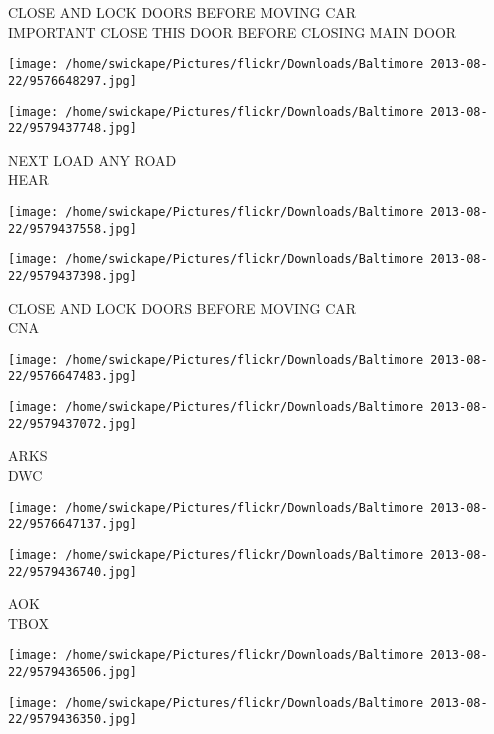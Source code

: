 \documentclass[10pt,letterpaper]{article}
\begin{document}
CLOSE AND LOCK DOORS BEFORE MOVING CAR\\
IMPORTANT CLOSE THIS DOOR BEFORE CLOSING MAIN DOOR\\
\pagebreak

\texttt{[image: /home/swickape/Pictures/flickr/Downloads/Baltimore 2013-08-22/9576648297.jpg]}

\vspace{0.25in}
\texttt{[image: /home/swickape/Pictures/flickr/Downloads/Baltimore 2013-08-22/9579437748.jpg]}

NEXT LOAD ANY ROAD\\
HEAR\\
\pagebreak

\texttt{[image: /home/swickape/Pictures/flickr/Downloads/Baltimore 2013-08-22/9579437558.jpg]}

\vspace{0.25in}
\texttt{[image: /home/swickape/Pictures/flickr/Downloads/Baltimore 2013-08-22/9579437398.jpg]}

CLOSE AND LOCK DOORS BEFORE MOVING CAR\\
CNA\\
\pagebreak

\texttt{[image: /home/swickape/Pictures/flickr/Downloads/Baltimore 2013-08-22/9576647483.jpg]}

\vspace{0.25in}
\texttt{[image: /home/swickape/Pictures/flickr/Downloads/Baltimore 2013-08-22/9579437072.jpg]}

ARKS\\
DWC\\
\pagebreak

\texttt{[image: /home/swickape/Pictures/flickr/Downloads/Baltimore 2013-08-22/9576647137.jpg]}

\vspace{0.25in}
\texttt{[image: /home/swickape/Pictures/flickr/Downloads/Baltimore 2013-08-22/9579436740.jpg]}

AOK\\
TBOX\\
\pagebreak

\texttt{[image: /home/swickape/Pictures/flickr/Downloads/Baltimore 2013-08-22/9579436506.jpg]}

\vspace{0.25in}
\texttt{[image: /home/swickape/Pictures/flickr/Downloads/Baltimore 2013-08-22/9579436350.jpg]}
\end{document}

